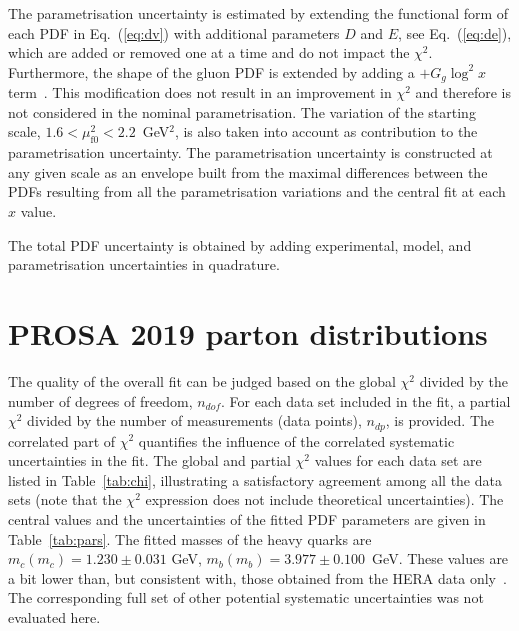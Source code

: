 The parametrisation uncertainty is estimated by extending the functional form of each PDF in Eq.~(\ref{eq:dv}) with additional parameters $D$ and $E$, see Eq.~(\ref{eq:de}), 
which are added or removed one at a time and do not impact the $\chi^2$. 
Furthermore, the shape of the gluon PDF is extended by adding a $+G_g\log^2 x$ term~\cite{Bonvini:2019wxf}. This modification does not result in an improvement in $\chi^2$ and therefore is not considered in the nominal parametrisation. 
The variation of the starting scale, $1.6 < \mu_\mathrm{f0}^2 < 2.2$~GeV$^2$, is also taken into account as contribution to the parametrisation uncertainty. The parametrisation uncertainty is constructed at any given scale as an envelope built from the maximal differences between the PDFs resulting from all the parametrisation variations and the central fit at each $x$ value.

The total PDF uncertainty is obtained by adding experimental, model, and parametrisation  uncertainties in quadrature.


%
%
%


\section{PROSA 2019 parton distributions}
\label{sec:results}

The quality of the overall fit can be judged based on the global $\chi^2$ divided by the number of degrees of freedom, $n_{dof}$. For each data set included in the fit, a partial $\chi^2$
divided by the number of measurements (data points), $n_{dp}$, is provided. The correlated part of $\chi^2$ quantifies the influence of the correlated systematic uncertainties in the fit. The global and partial $\chi^2$ values for each data set are listed in Table~\ref{tab:chi}, {\color{blue}illustrating a satisfactory agreement among all the data sets (note that the $\chi^2$ expression does not include theoretical uncertainties)}. The central values and the uncertainties of the fitted PDF parameters are given in Table~\ref{tab:pars}. 
The fitted masses of the heavy quarks are $m_c(m_c) = 1.230 \pm 0.031$ GeV, $m_b(m_b) = 3.977 \pm 0.100$~GeV. These values are a bit lower than, but consistent with, those obtained from the HERA data only~\cite{H1:2018flt}.
The corresponding full set of other potential systematic uncertainties was not evaluated here.


